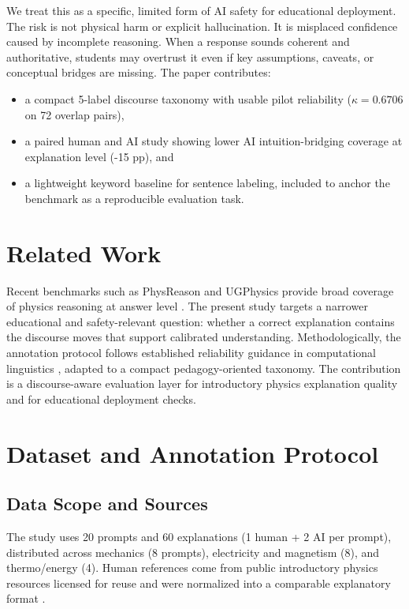 \documentclass{article}
\begin{document}
We treat this as a specific, limited form of AI safety for educational deployment. The risk is not physical harm or explicit hallucination. It is misplaced confidence caused by incomplete reasoning. When a response sounds coherent and authoritative, students may overtrust it even if key assumptions, caveats, or conceptual bridges are missing. The paper contributes:
\begin{itemize}
\item a compact 5-label discourse taxonomy with usable pilot reliability ($\kappa=0.6706$ on 72 overlap pairs),
\item a paired human and AI study showing lower AI intuition-bridging coverage at explanation level (-15 pp), and
\item a lightweight keyword baseline for sentence labeling, included to anchor the benchmark as a reproducible evaluation task.
\end{itemize}

\section{Related Work}
Recent benchmarks such as PhysReason and UGPhysics provide broad coverage of physics reasoning at answer level \citep{physreason2025,ugphysics2025}. The present study targets a narrower educational and safety-relevant question: whether a correct explanation contains the discourse moves that support calibrated understanding. Methodologically, the annotation protocol follows established reliability guidance in computational linguistics \citep{cohen1960,landis1977,artstein2008}, adapted to a compact pedagogy-oriented taxonomy. The contribution is a discourse-aware evaluation layer for introductory physics explanation quality and for educational deployment checks.

\section{Dataset and Annotation Protocol}
\subsection{Data Scope and Sources}
The study uses 20 prompts and 60 explanations (1 human + 2 AI per prompt), distributed across mechanics (8 prompts), electricity and magnetism (8), and thermo/energy (4). Human references come from public introductory physics resources licensed for reuse and were normalized into a comparable explanatory format \citep{openstaxlicense}.
\end{document}
